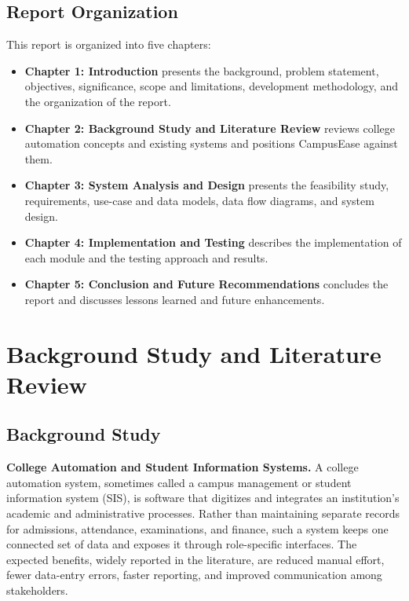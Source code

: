 \documentclass[12pt,a4paper]{report}
\begin{document}
\section{Report Organization}

This report is organized into five chapters:

\begin{itemize}
    \item \textbf{Chapter 1: Introduction} presents the background, problem statement, objectives, significance, scope and limitations, development methodology, and the organization of the report.
    \item \textbf{Chapter 2: Background Study and Literature Review} reviews college automation concepts and existing systems and positions CampusEase against them.
    \item \textbf{Chapter 3: System Analysis and Design} presents the feasibility study, requirements, use-case and data models, data flow diagrams, and system design.
    \item \textbf{Chapter 4: Implementation and Testing} describes the implementation of each module and the testing approach and results.
    \item \textbf{Chapter 5: Conclusion and Future Recommendations} concludes the report and discusses lessons learned and future enhancements.
\end{itemize}

\chapter{Background Study and Literature Review}

\section{Background Study}

\textbf{College Automation and Student Information Systems.}
A college automation system, sometimes called a campus management or student information system (SIS), is software that digitizes and integrates an institution's academic and administrative processes. Rather than maintaining separate records for admissions, attendance, examinations, and finance, such a system keeps one connected set of data and exposes it through role-specific interfaces. The expected benefits, widely reported in the literature, are reduced manual effort, fewer data-entry errors, faster reporting, and improved communication among stakeholders.
\end{document}
